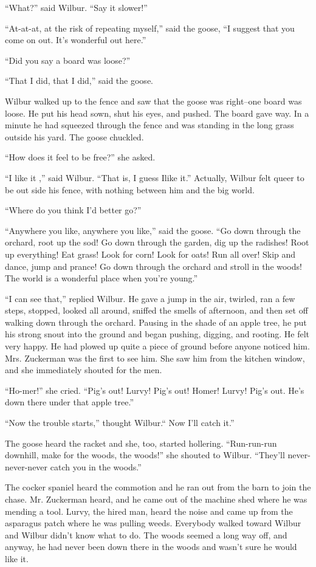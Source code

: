 \documentclass[a4paper, oneside]{book}
\begin{document}
 ``What?'' said Wilbur. ``Say it slower!''
 
  ``At-at-at, at the risk of repeating myself,'' said the goose, ``I
suggest that you come on out. It's wonderful out here.''

 ``Did you say a board was loose?''
 
 ``That I did, that I did,'' said the goose.
 
 Wilbur walked up to the fence and saw that the goose was
right--one board was loose. He put his head sown, shut his eyes,
and pushed. The board gave way. In a minute he had squeezed
through the fence and was standing in the long grass outside his
yard. The goose chuckled. 
 
``How does it feel to be free?'' she asked.

 ``I like it ,'' said Wilbur. ``That is, I guess Ilike it.'' Actually, Wilbur
felt queer to be out side his fence, with nothing between him and
the big world.

 ``Where do you think I'd better go?''  
 
  ``Anywhere you like, anywhere you like,'' said the goose. ``Go down
through the orchard, root up the sod! Go down through the garden,
dig up the radishes! Root up everything! Eat grass! Look for corn!
Look for oats! Run all over! Skip and dance, jump and prance! Go
down through the orchard and stroll in the woods! The world is a
wonderful place when you're young.'' 
  
``I can see that,'' replied Wilbur. He gave a jump in the air, twirled,
ran a few steps, stopped, looked all around, sniffed the smells of
afternoon, and then set off walking down through the orchard.
Pausing in the shade of an apple tree, he put his strong snout into
the ground and began pushing, digging, and rooting. He felt very
happy. He had plowed up quite a piece of ground before anyone
noticed him. Mrs. Zuckerman was the first to see him. She saw him
from the kitchen window, and she immediately shouted for the 
men. 

``Ho-mer!'' she cried. ``Pig's out! Lurvy! Pig's out! Homer! Lurvy!
Pig's out. He's down there under that apple tree.''

 ``Now the trouble starts,'' thought Wilbur.`` Now I'll catch it.''
 
 The goose heard the racket and she, too, started hollering.
``Run-run-run downhill, make for the woods, the woods!'' she
shouted to Wilbur. ``They'll never-never-never catch you in the
woods.'' 
  
The cocker spaniel heard the commotion and he ran out from the
barn to join the chase. Mr. Zuckerman heard, and he came out of
the machine shed where he was mending a tool. Lurvy, the hired
man, heard the noise and came up from the asparagus patch where
he was pulling weeds. Everybody walked toward Wilbur and
Wilbur didn't know what to do. The woods seemed a long way off,
and anyway, he had never been down there in the woods and
wasn't sure he would like it.
\end{document}
